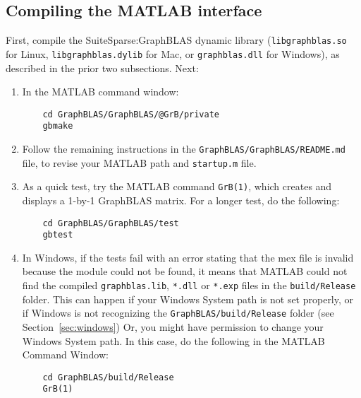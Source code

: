\documentclass[12pt]{article}
\begin{document}
\subsection{Compiling the MATLAB interface}

First, compile the SuiteSparse:GraphBLAS dynamic library
(\verb'libgraphblas.so' for Linux, \verb'libgraphblas.dylib' for Mac,
or \verb'graphblas.dll' for Windows), as described in the prior two
subsections.  Next:

\begin{enumerate}
\item In the MATLAB command window:

    {\small
    \begin{verbatim}
    cd GraphBLAS/GraphBLAS/@GrB/private
    gbmake \end{verbatim} }

\item Follow the remaining instructions in the
    \verb'GraphBLAS/GraphBLAS/README.md' file, to revise your
    MATLAB path and \verb'startup.m' file.

\item As a quick test, try the MATLAB command \verb'GrB(1)', which
    creates and displays a 1-by-1 GraphBLAS matrix.  For a longer test, do the
    following:

    {\small
    \begin{verbatim}
    cd GraphBLAS/GraphBLAS/test
    gbtest \end{verbatim} }

\item In Windows, if the tests fail with an error stating that the
    mex file is invalid because the module could not be found, it means
    that MATLAB could not find the compiled \verb'graphblas.lib', \verb'*.dll'
    or \verb'*.exp' files in the \verb'build/Release' folder.  This can happen
    if your Windows System path is not set properly, or if Windows is not
    recognizing the \verb'GraphBLAS/build/Release' folder (see
    Section~\ref{sec:windows})  Or, you might have permission to change your
    Windows System path.  In this case, do the following in the MATLAB Command
    \vspace{-0.1in}
    Window:

    \vspace{-0.1in}
    {\small
    \begin{verbatim}
    cd GraphBLAS/build/Release
    GrB(1) \end{verbatim} }


\end{enumerate}
\end{document}
